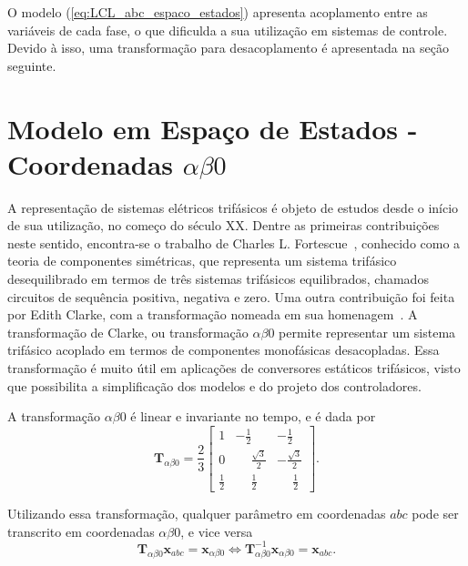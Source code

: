     O modelo (\ref{eq:LCL_abc_espaco_estados}) apresenta acoplamento entre as variáveis de cada fase, o que dificulda a sua utilização em sistemas de controle. Devido à isso, uma transformação para desacoplamento é apresentada na seção seguinte.

\section{Modelo em Espaço de Estados - Coordenadas $\alpha \beta 0$}

    A representação de sistemas elétricos trifásicos é objeto de estudos desde o início de sua utilização, no começo do século XX. Dentre as primeiras contribuições neste sentido, encontra-se o trabalho de Charles L. Fortescue~\cite{ref:FORTESCUE}, conhecido como a teoria de componentes simétricas, que representa um sistema trifásico desequilibrado em termos de três sistemas trifásicos equilibrados, chamados circuitos de sequência positiva, negativa e zero. Uma outra contribuição foi feita por Edith Clarke, com a transformação nomeada em sua homenagem~\cite{ref:CLARKE}. A transformação de Clarke, ou transformação $\alpha \beta 0$ permite representar um sistema trifásico acoplado em termos de componentes monofásicas desacopladas. Essa transformação é muito útil em aplicações de conversores estáticos trifásicos, visto que possibilita a simplificação dos modelos e do projeto dos controladores.

    A transformação $\alpha \beta 0$ é linear e invariante no tempo, e é dada por
    \begin{equation}
        \mathbf{T}_{\alpha \beta 0} = \frac{2}{3} \left[
        \begin{array}{ccc}
            1 & -\frac{1}{2} & -\frac{1}{2} \\[0.3em]
            0 & \phantom{-}\frac{\sqrt{3}}{2} & -\frac{\sqrt{3}}{2} \\[0.3em]
            \frac{1}{2} &  \phantom{-}\frac{1}{2} & \phantom{-}\frac{1}{2}
        \end{array}
        \right] \text{.}
        \label{eq:alpha_beta_0}
    \end{equation}

    Utilizando essa transformação, qualquer parâmetro em coordenadas $abc$ pode ser transcrito em coordenadas $\alpha \beta 0$, e vice versa
    \begin{equation}
        \mathbf{T}_{\alpha \beta 0} \mathbf{x}_{abc} = \mathbf{x}_{\alpha \beta 0}
        \iff
        \mathbf{T}_{\alpha \beta 0}^{-1} \mathbf{x}_{\alpha \beta 0} = \mathbf{x}_{abc}
        \text{.}
    \end{equation}

